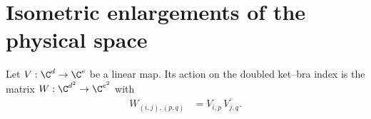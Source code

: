 \section{Isometric enlargements of the physical space}


\begin{definition}
    \label{def:mpdo_doubled_physical_matrix}
    \leanok
    Let $V:\C^d\to\C^e$ be a linear map.  Its action on the doubled
    ket--bra index is the matrix $W:\C^{d^2}\to\C^{e^2}$ with
    \begin{align}
        W_{(i,j),(p,q)}
         & =V_{i,p}\,\overline{V_{j,q}}.
        \label{eq:mpdo_doubled_physical_matrix}
    \end{align}
\end{definition}

